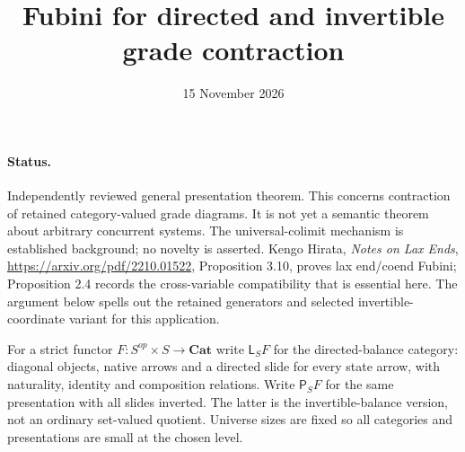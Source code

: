 \documentclass[11pt]{article}
\title{Fubini for directed and invertible grade contraction}
\date{15 November 2026}
\begin{document}
\maketitle
\paragraph{Status.} Independently reviewed general presentation theorem. This concerns contraction of retained category-valued grade diagrams. It is not yet a semantic theorem about arbitrary concurrent systems. The universal-colimit mechanism is established background; no novelty is asserted. Kengo Hirata, \emph{Notes on Lax Ends}, \url{https://arxiv.org/pdf/2210.01522}, Proposition 3.10, proves lax end/coend Fubini; Proposition 2.4 records the cross-variable compatibility that is essential here. The argument below spells out the retained generators and selected invertible-coordinate variant for this application.

For a strict functor $F:S^{op}\times S\to\mathbf{Cat}$ write $\mathsf L_SF$ for the directed-balance category: diagonal objects, native arrows and a directed slide for every state arrow, with naturality, identity and composition relations. Write $\mathsf P_SF$ for the same presentation with all slides inverted. The latter is the invertible-balance version, not an ordinary set-valued quotient. Universe sizes are fixed so all categories and presentations are small at the chosen level.
\end{document}
